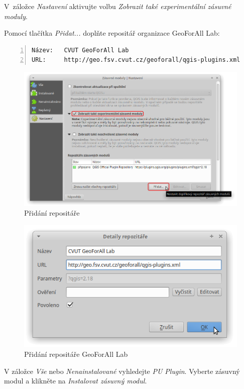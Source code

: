 V~záložce \textit{Nastavení} aktivujte volbu \textit{Zobrazit také experimentální zásuvné moduly}.

Pomocí tlačítka \textit{Přidat...} doplňte repositář organizace GeoForAll Lab:

\begin{lstlisting}[basicstyle=\footnotesize\ttfamily, backgroundcolor = \color{light-gray},  numbers=left, columns=fullflexible, keepspaces=true]
Název:   CVUT GeoForAll Lab
URL:     http://geo.fsv.cvut.cz/geoforall/qgis-plugins.xml
\end{lstlisting}

	\begin{figure}[H]
		\centering
		\includegraphics[width=.85\textwidth]{./pictures/instalace-pridani_repositare.png}
		\caption[Přidání repositáře]{Přidání repositáře}
		\label{fig:manual_pridani_repozitare}
 	\end{figure}
 	
	\begin{figure}[H]
		\centering
		\includegraphics[width=.6\textwidth]{./pictures/instalace-pridani_repositare_geoforall.png}
		\caption[Přidání repositáře GeoForAll Lab]{Přidání repositáře GeoForAll Lab}
		\label{fig:manual_pridani_repozitare_geoforall_lab}
 	\end{figure}

V záložce \textit{Vše} nebo \textit{Nenainstalované} vyhledejte \textit{PU Plugin}. Vyberte zásuvný modul a klikněte na \textit{Instalovat zásuvný modul}.


